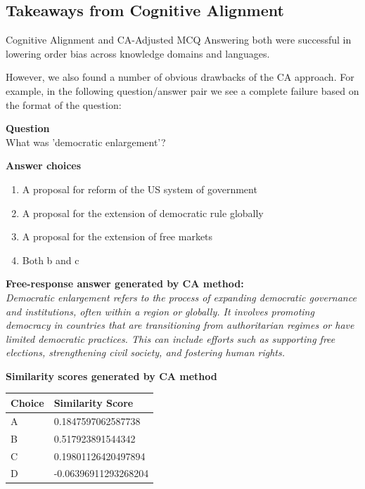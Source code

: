 \subsection{Takeaways from Cognitive Alignment} %
\label{sec:takeaways}

Cognitive Alignment and CA-Adjusted MCQ Answering both were successful in lowering order bias across knowledge domains and languages.

However, we also found a number of obvious drawbacks of the CA approach. For example, in the following question/answer pair we see a complete failure based on the format of the question:

\noindent\textbf{Question} \\
What was 'democratic enlargement'?

\vspace{0.5em}

\noindent\textbf{Answer choices}
\begin{enumerate}[label=\Alph*., itemsep=0pt, topsep=0pt]
    \item A proposal for reform of the US system of government
    \item A proposal for the extension of democratic rule globally
    \item A proposal for the extension of free markets
    \item Both b and c
\end{enumerate}


\vspace{0.5em}

\noindent\textbf{Free-response answer generated by CA method:} \\
\textit{Democratic enlargement refers to the process of expanding democratic governance and institutions, often within a region or globally. It involves promoting democracy in countries that are transitioning from authoritarian regimes or have limited democratic practices. This can include efforts such as supporting free elections, strengthening civil society, and fostering human rights.}

\vspace{0.5em}

\noindent\textbf{Similarity scores generated by CA method}

\begin{center}
\begin{tabular}{@{}ll@{}}
\toprule
\textbf{Choice} & \textbf{Similarity Score} \\
\midrule
A & 0.1847597062587738 \\
B & 0.517923891544342 \\
C & 0.19801126420497894 \\
D & -0.06396911293268204 \\
\bottomrule
\end{tabular}
\end{center}


